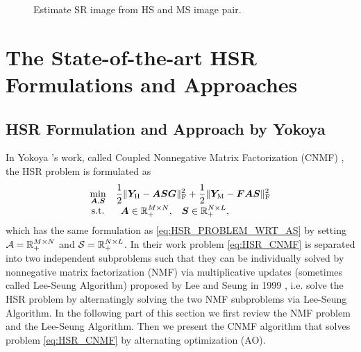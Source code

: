 \begin{figure}[t]
{
    }
    \caption{Estimate SR image from HS and MS image pair.}
    \label{fig:HSR_problem_visualize}
\end{figure}

\section{The State-of-the-art HSR Formulations and Approaches}

\subsection{HSR Formulation and Approach by Yokoya \etal}
In Yokoya \etal's work, called Coupled Nonnegative Matrix Factorization (CNMF)
\cite{CNMF},
the HSR problem is formulated as
\begin{equation}
    \begin{array}{cl}
        \underset{\bm A ,\bm S}{\min} &
        \displaystyle
        \frac{1}{2} \Vert \bm Y_\text H - \bm A \bm S \bm G \Vert_\text F^2 +
        \frac{1}{2} \Vert \bm Y_\text M - \bm F \bm A \bm S \Vert_\text F^2 \\
        \text{s.t.} &
        \begin{array}{cc}
            \bm A \in \mathbb R_+^{M \times N}, &
            \bm S \in \mathbb R_+^{N \times L},
        \end{array}
    \end{array}
    \label{eq:HSR_CNMF}
\end{equation}
which has the same formulation as \eqref{eq:HSR_PROBLEM_WRT_AS} by setting
$\mathcal A = \mathbb R_+^{M \times N}$ and $\mathcal S = \mathbb R_+^{N \times L}$.
In their work problem \eqref{eq:HSR_CNMF} is separated into two independent
subproblems such that they can be individually solved by nonnegative matrix
factorization (NMF) via multiplicative updates (sometimes called Lee-Seung
Algorithm) proposed by Lee and Seung in 1999
\cite{LSMU_NATURE1999,LSMU_NIPS2000},
i.e.
solve the HSR problem by alternatingly solving the two NMF subproblems via
Lee-Seung Algorithm.
In the following part of this section we first review the NMF problem and the
Lee-Seung Algorithm.
Then we present the CNMF algorithm that solves problem \eqref{eq:HSR_CNMF} by
alternating optimization (AO).

